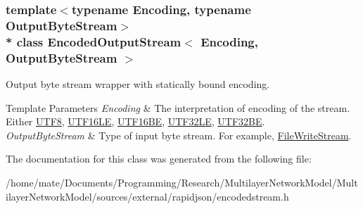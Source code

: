 \subsubsection*{template$<$typename Encoding, typename Output\+Byte\+Stream$>$\\*
class Encoded\+Output\+Stream$<$ Encoding, Output\+Byte\+Stream $>$}

Output byte stream wrapper with statically bound encoding. 


\begin{DoxyTemplParams}{Template Parameters}
{\em Encoding} & The interpretation of encoding of the stream. Either \hyperlink{structUTF8}{U\+T\+F8}, \hyperlink{structUTF16LE}{U\+T\+F16\+LE}, \hyperlink{structUTF16BE}{U\+T\+F16\+BE}, \hyperlink{structUTF32LE}{U\+T\+F32\+LE}, \hyperlink{structUTF32BE}{U\+T\+F32\+BE}. \\
\hline
{\em Output\+Byte\+Stream} & Type of input byte stream. For example, \hyperlink{classFileWriteStream}{File\+Write\+Stream}. \\
\hline
\end{DoxyTemplParams}


The documentation for this class was generated from the following file\+:\begin{DoxyCompactItemize}
\item 
/home/mate/\+Documents/\+Programming/\+Research/\+Multilayer\+Network\+Model/\+Multilayer\+Network\+Model/sources/external/rapidjson/encodedstream.\+h\end{DoxyCompactItemize}
